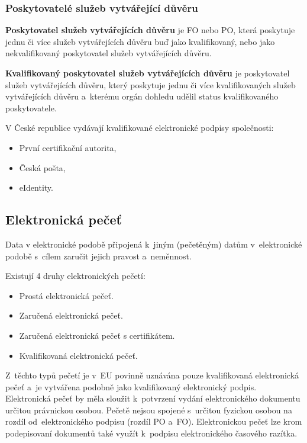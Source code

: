 \subsubsection{Poskytovatelé služeb vytvářející důvěru}

\textbf{Poskytovatel služeb vytvářejících důvěru} je FO nebo PO, která poskytuje jednu či více služeb vytvářejících důvěru buď jako kvalifikovaný, nebo jako nekvalifikovaný poskytovatel služeb vytvářejících důvěru.

\textbf{Kvalifikovaný poskytovatel služeb vytvářejících důvěru} je poskytovatel služeb vytvářejících důvěru, který poskytuje jednu či více kvalifikovaných služeb vytvářejících důvěru a~kterému orgán dohledu udělil status kvalifikovaného poskytovatele.

V České republice vydávají kvalifikované elektronické podpisy společnosti:
\begin{itemize}
    \item První certifikační autorita,
    \item Česká pošta,
    \item eIdentity.
\end{itemize}

\subsection{Elektronická pečeť}

Data v elektronické podobě připojená k~jiným (pečetěným) datům v~elektronické podobě s~cílem zaručit jejich pravost a~neměnnost.

Existují 4 druhy elektronických pečetí:
\begin{itemize}
    \item Prostá elektronická pečeť.
    \item Zaručená elektronická pečeť.
    \item Zaručená elektronická pečeť s certifikátem.
    \item Kvalifikovaná elektronická pečeť.
\end{itemize}

Z~těchto typů pečetí je v~EU povinně uznávána pouze kvalifikovaná elektronická pečeť a~je vytvářena podobně jako kvalifikovaný elektronický podpis. Elektronická pečeť by měla sloužit k~potvrzení vydání elektronického dokumentu určitou právnickou osobou. Pečetě nejsou spojené s~určitou fyzickou osobou na rozdíl od~elektronického podpisu (rozdíl PO a~FO). Elektronickou pečeť lze krom podepisovaní dokumentů také využít k~podpisu elektronického časového razítka.

